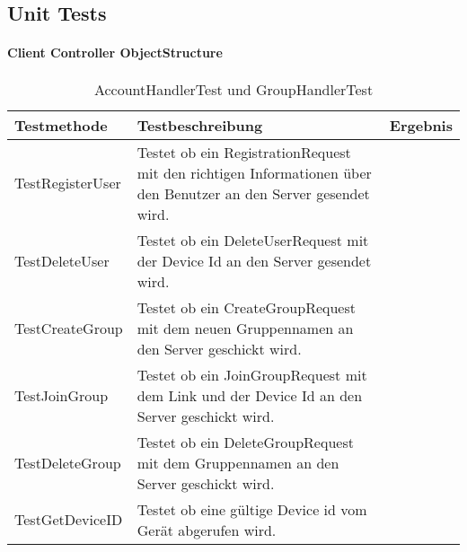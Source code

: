 \subsection{Unit Tests}
	\paragraph{Client Controller ObjectStructure}
	\begin{table}[H]
		{
			\begin{tabular}{|p{}|p{}|>{\centering}p{}|}
				\hline
				Testmethode & Testbeschreibung & Ergebnis\tabularnewline
				\hline
				\hspace{0pt}TestRegisterUser & Testet ob ein RegistrationRequest mit den richtigen Informationen über den Benutzer an den Server gesendet wird. &			\checkmark\tabularnewline
				\hspace{0pt}TestDeleteUser & Testet ob ein DeleteUserRequest mit der Device Id an den Server gesendet wird. & \checkmark\tabularnewline		
				\hspace{0pt}TestCreateGroup & Testet ob ein CreateGroupRequest mit dem neuen Gruppennamen an den Server geschickt wird. & \checkmark\tabularnewline
				\hspace{0pt}TestJoinGroup & Testet ob ein JoinGroupRequest mit dem Link und der Device Id an den Server geschickt wird. & \checkmark\tabularnewline
				\hspace{0pt}TestDeleteGroup & Testet ob ein DeleteGroupRequest mit dem Gruppennamen an den Server geschickt wird. & \checkmark\tabularnewline
				\hspace{0pt}TestGetDeviceID & Testet ob eine gültige Device id vom Gerät abgerufen wird. & \checkmark\tabularnewline
				\hline
			\end{tabular}}
		\caption{AccountHandlerTest und GroupHandlerTest}
	\end{table}
	
